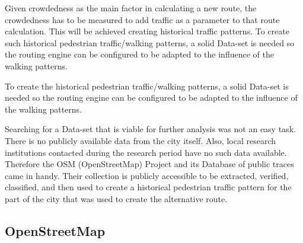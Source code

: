Given crowdedness as the main factor in calculating a new route, the crowdedness has to be measured to add traffic as a parameter to that route calculation. This will be achieved creating historical traffic patterns. To create such historical pedestrian traffic/walking patterns, a solid Data-set is needed so the routing engine can be configured to be adapted to the influence of the walking patterns. 






To create the historical pedestrian traffic/walking patterns, a solid Data-set is needed so the routing engine can be configured to be adapted to the influence of the walking patterns. 

Searching for a Data-set that is viable for further analysis was not an easy task. There is no publicly available data from the city itself. Also, local research institutions contacted during the research period have no such data available. Therefore the OSM (OpenStreetMap) Project and its Database of public traces came in handy. Their collection is publicly accessible to be extracted, verified, classified, and then used to create a historical pedestrian traffic pattern for the part of the city that was used to create the alternative route.


\subsection{OpenStreetMap}

